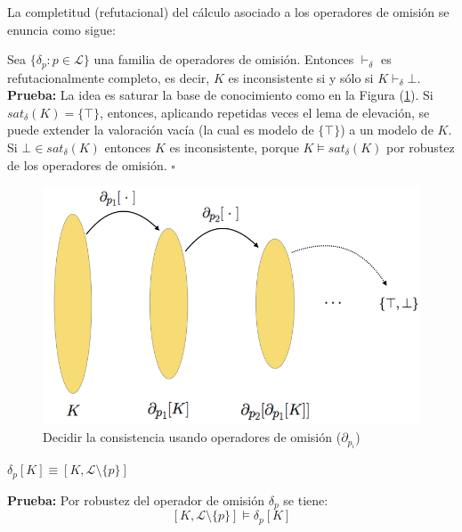 La completitud (refutacional) del cálculo asociado a los operadores de omisión se enuncia como sigue:

\thm \label{teo:completo} Sea $\{ \delta_p : p \in \mathcal{L} \}$ una familia de operadores de omisión. Entonces $\vdash_{\delta}$ es refutacionalmente completo, es decir, $K$ es inconsistente si y sólo si $K \vdash_{\delta} \bot$.\\

\noindent \textbf{Prueba:} La idea es saturar la base de conocimiento como en la Figura (\ref{fig:comple}). Si $sat_{\delta} (K) = \{ \top \}$, entonces, aplicando repetidas veces el lema de elevación, se puede extender la valoración vacía (la cual es modelo de $\{ \top \}$) a un modelo de $K$.\\
Si $\bot \in sat_{\delta} (K)$ entonces $K$ es inconsistente, porque $K \vDash sat_{\delta} (K)$ por robustez de los operadores de omisión. $\square$ %

\vspace{0.5cm}
\begin{figure}[h]
	\centering
		\includegraphics[scale=0.44]{imagenes/comple.png}
	\caption{Decidir la consistencia usando operadores de omisión ($\partial_{p_i}$)}
	\label{fig:comple}
\end{figure}
\vspace{0.5cm}

\cor \label{cor:omitep} $\delta_p [K] \equiv [K, \mathcal{L} \setminus \{ p \}]$

\noindent \textbf{Prueba:} Por robustez del operador de omisión $\delta_p$ se tiene:
$$[K, \mathcal{L} \setminus \{ p \}] \vDash \delta_p [K]$$

